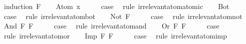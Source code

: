 \begin{isabellebody}
%
\isadelimproof
%
\endisadelimproof
%
\isatagproof
{}\isamarkupfalse%
\ {\isacharparenleft}induction\ F{\isacharparenright}\isanewline
\ \ \isamarkupfalse%
\ {\isacharparenleft}Atom\ x{\isacharparenright}\isanewline
\ \ \isamarkupfalse%
\ \isamarkupfalse%
\ {\isacharquery}case\ \isamarkupfalse%
\ {\isacharparenleft}rule\ irrelevant{\isacharunderscore}atom{\isacharunderscore}atomic{\isacharparenright}\isanewline
{}\isamarkupfalse%
\isanewline
\ \ \isamarkupfalse%
\ Bot\isanewline
\ \ \isamarkupfalse%
\ \isamarkupfalse%
\ {\isacharquery}case\ \isamarkupfalse%
\ {\isacharparenleft}rule\ irrelevant{\isacharunderscore}atom{\isacharunderscore}bot{\isacharparenright}\isanewline
{}\isamarkupfalse%
\isanewline
\ \ \isamarkupfalse%
\ {\isacharparenleft}Not\ F{\isacharparenright}\isanewline
\ \ \isamarkupfalse%
\ \isamarkupfalse%
\ {\isacharquery}case\ \isamarkupfalse%
\ {\isacharparenleft}rule\ irrelevant{\isacharunderscore}atom{\isacharunderscore}not{\isacharparenright}\isanewline
{}\isamarkupfalse%
\isanewline
\ \ \isamarkupfalse%
\ {\isacharparenleft}And\ F{}\ F{}{\isacharparenright}\isanewline
\ \ \isamarkupfalse%
\ \isamarkupfalse%
\ {\isacharquery}case\ \isamarkupfalse%
\ {\isacharparenleft}rule\ irrelevant{\isacharunderscore}atom{\isacharunderscore}and{\isacharparenright}\isanewline
{}\isamarkupfalse%
\isanewline
\ \ \isamarkupfalse%
\ {\isacharparenleft}Or\ F{}\ F{}{\isacharparenright}\isanewline
\ \ \isamarkupfalse%
\ \isamarkupfalse%
\ {\isacharquery}case\ \isamarkupfalse%
\ {\isacharparenleft}rule\ irrelevant{\isacharunderscore}atom{\isacharunderscore}or{\isacharparenright}\isanewline
{}\isamarkupfalse%
\isanewline
\ \ \isamarkupfalse%
\ {\isacharparenleft}Imp\ F{}\ F{}{\isacharparenright}\isanewline
\ \ \isamarkupfalse%
\ \isamarkupfalse%
\ {\isacharquery}case\ \isamarkupfalse%
\ {\isacharparenleft}rule\ irrelevant{\isacharunderscore}atom{\isacharunderscore}imp{\isacharparenright}\isanewline
{}\isamarkupfalse%
%
\endisatagproof
{\isafoldproof}%
%
\isadelimproof
%
\endisadelimproof
%
\begin{isamarkuptext}%

\end{isamarkuptext}
\end{isabellebody}
